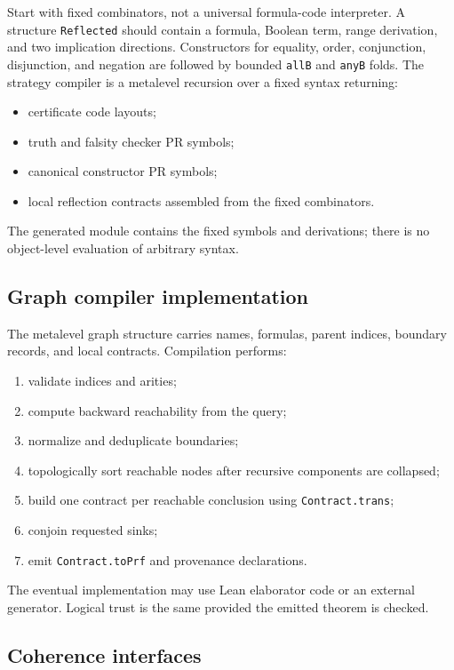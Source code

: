 Start with fixed combinators, not a universal formula-code interpreter.  A structure \texttt{Reflected} should contain a formula, Boolean term, range derivation, and two implication directions.  Constructors for equality, order, conjunction, disjunction, and negation are followed by bounded \texttt{allB} and \texttt{anyB} folds.  The strategy compiler is a metalevel recursion over a fixed syntax returning:
\begin{itemize}
  \item certificate code layouts;
  \item truth and falsity checker PR symbols;
  \item canonical constructor PR symbols;
  \item local reflection contracts assembled from the fixed combinators.
\end{itemize}
The generated module contains the fixed symbols and derivations; there is no object-level evaluation of arbitrary syntax.

\subsection{Graph compiler implementation}

The metalevel graph structure carries names, formulas, parent indices, boundary records, and local contracts.  Compilation performs:
\begin{enumerate}
  \item validate indices and arities;
  \item compute backward reachability from the query;
  \item normalize and deduplicate boundaries;
  \item topologically sort reachable nodes after recursive components are collapsed;
  \item build one contract per reachable conclusion using \texttt{Contract.trans};
  \item conjoin requested sinks;
  \item emit \texttt{Contract.toPrf} and provenance declarations.
\end{enumerate}
The eventual implementation may use Lean elaborator code or an external generator.  Logical trust is the same provided the emitted theorem is checked.

\subsection{Coherence interfaces}

